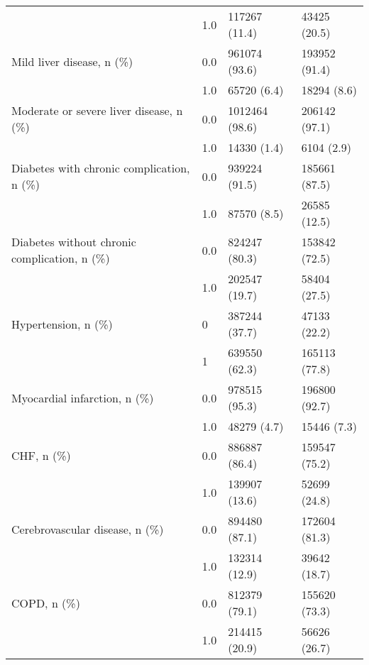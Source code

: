 \begin{tabular}{llll}
                                       & 1.0 &                         117267 (11.4) &      43425 (20.5) \\
Mild liver disease, n (\%) & 0.0 &                         961074 (93.6) &     193952 (91.4) \\
                                       & 1.0 &                           65720 (6.4) &       18294 (8.6) \\
Moderate or severe liver disease, n (\%) & 0.0 &                        1012464 (98.6) &     206142 (97.1) \\
                                       & 1.0 &                           14330 (1.4) &        6104 (2.9) \\
Diabetes with chronic complication, n (\%) & 0.0 &                         939224 (91.5) &     185661 (87.5) \\
                                       & 1.0 &                           87570 (8.5) &      26585 (12.5) \\
Diabetes without chronic complication, n (\%) & 0.0 &                         824247 (80.3) &     153842 (72.5) \\
                                       & 1.0 &                         202547 (19.7) &      58404 (27.5) \\
Hypertension, n (\%) & 0 &                         387244 (37.7) &      47133 (22.2) \\
                                       & 1 &                         639550 (62.3) &     165113 (77.8) \\
Myocardial infarction, n (\%) & 0.0 &                         978515 (95.3) &     196800 (92.7) \\
                                       & 1.0 &                           48279 (4.7) &       15446 (7.3) \\
CHF, n (\%) & 0.0 &                         886887 (86.4) &     159547 (75.2) \\
                                       & 1.0 &                         139907 (13.6) &      52699 (24.8) \\
Cerebrovascular disease, n (\%) & 0.0 &                         894480 (87.1) &     172604 (81.3) \\
                                       & 1.0 &                         132314 (12.9) &      39642 (18.7) \\
COPD, n (\%) & 0.0 &                         812379 (79.1) &     155620 (73.3) \\
                                       & 1.0 &                         214415 (20.9) &      56626 (26.7) \\

\end{tabular}
